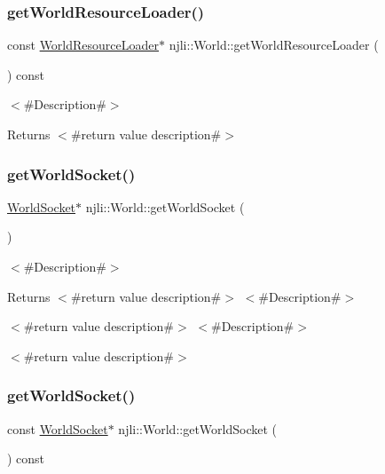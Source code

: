 \subsubsection{\texorpdfstring{get\+World\+Resource\+Loader()}{getWorldResourceLoader()}\hspace{0.1cm}{\footnotesize\ttfamily [2/2]}}
{\footnotesize\ttfamily const \mbox{\hyperlink{classnjli_1_1_world_resource_loader}{World\+Resource\+Loader}}$\ast$ njli\+::\+World\+::get\+World\+Resource\+Loader (\begin{DoxyParamCaption}{ }\end{DoxyParamCaption}) const}

$<$\#\+Description\#$>$

\begin{DoxyReturn}{Returns}
$<$\#return value description\#$>$ 
\end{DoxyReturn}
\mbox{\label{classnjli_1_1_world_a245f64dbfb8ac4b9aa405c05c58a77e5}} 
\subsubsection{\texorpdfstring{get\+World\+Socket()}{getWorldSocket()}\hspace{0.1cm}{\footnotesize\ttfamily [1/2]}}
{\footnotesize\ttfamily \mbox{\hyperlink{classnjli_1_1_world_socket}{World\+Socket}}$\ast$ njli\+::\+World\+::get\+World\+Socket (\begin{DoxyParamCaption}{ }\end{DoxyParamCaption})}

$<$\#\+Description\#$>$

\begin{DoxyReturn}{Returns}
$<$\#return value description\#$>$ $<$\#\+Description\#$>$

$<$\#return value description\#$>$ $<$\#\+Description\#$>$

$<$\#return value description\#$>$ 
\end{DoxyReturn}
\mbox{\label{classnjli_1_1_world_a58cd945663087fae147a88f76a984f83}} 
\subsubsection{\texorpdfstring{get\+World\+Socket()}{getWorldSocket()}\hspace{0.1cm}{\footnotesize\ttfamily [2/2]}}
{\footnotesize\ttfamily const \mbox{\hyperlink{classnjli_1_1_world_socket}{World\+Socket}}$\ast$ njli\+::\+World\+::get\+World\+Socket (\begin{DoxyParamCaption}{ }\end{DoxyParamCaption}) const}

